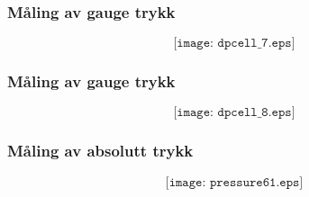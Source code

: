 \documentclass[aspectratio=169,xcolor=dvipsnames]{beamer}
\begin{document}
%
%
%
%
\begin{frame}
	\frametitle{Måling av gauge trykk}

	$$\texttt{[image: dpcell\_7.eps]}$$
\end{frame}

%
%
%
\begin{frame}
	\frametitle{Måling av gauge trykk}

	$$\texttt{[image: dpcell\_8.eps]}$$
\end{frame}
%
%
%
%
%
%
\begin{frame}
	\frametitle{Måling av absolutt trykk}

	$$\texttt{[image: pressure61.eps]}$$
\end{frame}
\end{document}
